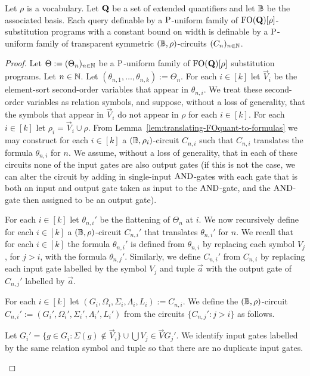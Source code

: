 \documentclass[../main/thesis.tex]{subfiles}
\begin{document}
\begin{prop}
  Let $\rho$ is a vocabulary. Let $\mathbf{Q}$ be a set of extended quantifiers
  and let $\mathbb{B}$ be the associated basis. Each query definable by a $\mathrm{P}$-uniform
  family of $\text{\upshape FO}(\mathbf{Q})[\rho]$-substitution programs with a constant bound
  on width is definable by a $\mathrm{P}$-uniform family of transparent symmetric
  $(\mathbb{B}, \rho)$-circuits $(C_n)_{n \in \mathbb{N}}$.
  \label{prop:translating-programs-to-circuits}
\end{prop}
\begin{proof}
  Let $\Theta := (\Theta_n)_{n \in \mathbb{N}}$ be a $\mathrm{P}$-uniform family of
  $\text{\upshape FO}(\mathbf{Q})[\rho]$ substitution programs. Let $n \in \mathbb{N}$. Let
  $(\theta_{n, 1}, \ldots, \theta_{n, k}) := \Theta_n$. For each $i \in [k]$ let
  $\vec{V}_i$ be the element-sort second-order variables that appear in
  $\theta_{n, i}$. We treat these second-order variables as relation symbols,
  and suppose, without a loss of generality, that the symbols that appear in
  $\vec{V}_i$ do not appear in $\rho$ for each $i \in [k]$. For each $i \in [k]$
  let $\rho_i = \vec{V}_i \cup \rho$. From
  Lemma~\ref{lem:translating-FOquant-to-formulas} we may construct for each $i
  \in [k]$ a $(\mathbb{B}, \rho_i)$-circuit $C_{n, i}$ such that $C_{n, i}$ translates
  the formula $\theta_{n, i}$ for $n$. We assume, without a loss of generality,
  that in each of these circuits none of the input gates are also output gates
  (if this is not the case, we can alter the circuit by adding in single-input
  $\text{\upshape AND}$-gates with each gate that is both an input and output gate taken as
  input to the $\text{\upshape AND}$-gate, and the $\text{\upshape AND}$-gate then assigned to be an output
  gate).

  For each $i \in [k]$ let $\theta_{n, i}'$ be the flattening of $\Theta_n$ at
  $i$. We now recursively define for each $i \in [k]$ a $(\mathbb{B}, \rho)$-circuit
  $C_{n, i}'$ that translates $\theta_{n, i}'$ for $n$. We recall that for each
  $i \in [k]$ the formula $\theta_{n, i}'$ is defined from $\theta_{n, i}$ by
  replacing each symbol $V_j$, for $j > i$, with the formula $\theta_{n, j}'$.
  Similarly, we define $C_{n, i}'$ from $C_{n, i}$ by replacing each input gate
  labelled by the symbol $V_j$ and tuple $\vec{a}$ with the output gate of
  $C_{n, j}'$ labelled by $\vec{a}$.

  For each $i \in [k]$ let $(G_i, \Omega_i, \Sigma_i, \Lambda_i, L_i) := C_{n,
    i}$. We define the $(\mathbb{B},\rho)$-circuit $C_{n, i}' := (G_i', \Omega_i',
  \Sigma_i', \Lambda_i', L_i')$ from the circuits $\{C_{n, j}' : j > i \}$ as
  follows.
  \begin{myitemize}
  \item Let $G_i' = \{g \in G_i : \Sigma (g) \not\in \vec{V}_i\} \cup
    \bigcup{V_{j} \in \vec{V}} G_{j}'$. We identify input gates labelled by the
    same relation symbol and tuple so that there are no duplicate input gates.
    

\end{myitemize}
\end{proof}
\end{document}
